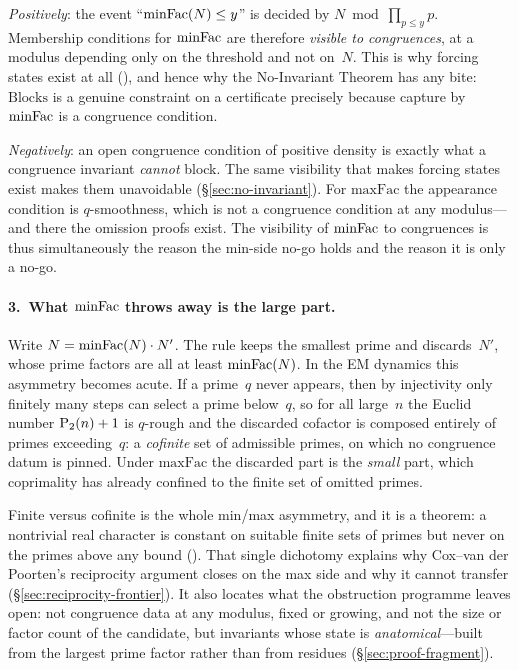 \emph{Positively}: the event ``$\mathrm{minFac}(N) \leq y$'' is decided by
$N \bmod \prod_{p \leq y} p$.  Membership conditions for $\mathrm{minFac}$ are
therefore \emph{visible to congruences}, at a modulus depending only on
the threshold and not on~$N$.  This is why forcing states exist at all
(), and hence why the
No-Invariant Theorem has any bite: $\mathrm{Blocks}$ is a genuine
constraint on a certificate precisely because capture by $\mathrm{minFac}$ is a
congruence condition.

\emph{Negatively}: an open congruence condition of positive density is
exactly what a congruence invariant \emph{cannot} block.  The same
visibility that makes forcing states exist makes them unavoidable
(\S\ref{sec:no-invariant}).  For $\mathrm{maxFac}$ the appearance
condition is $q$-smoothness, which is not a congruence condition at any
modulus---and there the omission proofs exist.  The visibility of
$\mathrm{minFac}$ to congruences is thus simultaneously the reason the min-side
no-go holds and the reason it is only a no-go.

\paragraph{3.\ What $\mathrm{minFac}$ throws away is the large part.}
Write $N = \mathrm{minFac}(N) \cdot N'$.  The rule keeps the smallest prime and
discards~$N'$, whose prime factors are all at least $\mathrm{minFac}(N)$.  In
the EM dynamics this asymmetry becomes acute.  If a prime~$q$ never
appears, then by injectivity only finitely many steps can select a prime
below~$q$, so for all large~$n$ the Euclid number $\mathrm{P}_{2}(n)+1$ is
$q$-rough and the discarded cofactor is composed entirely of primes
exceeding~$q$: a \emph{cofinite} set of admissible primes, on which no
congruence datum is pinned.  Under $\mathrm{maxFac}$ the discarded part
is the \emph{small} part, which coprimality has already confined to the
finite set of omitted primes.

Finite versus cofinite is the whole min/max asymmetry, and it is a
theorem: a nontrivial real character is constant on suitable finite sets
of primes but never on the primes above any bound
().  That
single dichotomy explains why Cox--van der Poorten's reciprocity
argument closes on the max side and why it cannot transfer
(\S\ref{sec:reciprocity-frontier}).  It also locates what the
obstruction programme leaves open: not congruence data at any modulus,
fixed or growing, and not the size or factor count of the candidate, but
invariants whose state is \emph{anatomical}---built from the largest
prime factor rather than from residues (\S\ref{sec:proof-fragment}).

